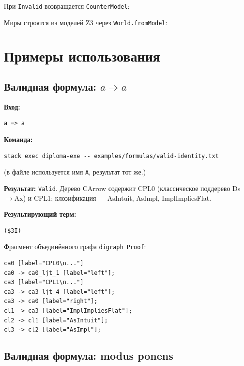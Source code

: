 \documentclass[a4paper,12pt]{article}
\newenvironment{listingcenter}{%
  \begin{center}\begin{minipage}{\linewidth}%
}{%
  \end{minipage}\end{center}%
}
\newcommand{\hssnippet}[2]{%
  \begin{listingcenter}%
  \end{listingcenter}}
\begin{document}
При \texttt{Invalid} возвращается \texttt{CounterModel}:
\hssnippet{countermodel.hs}{Структура контрмодели \texttt{CounterModel}}

Миры строятся из моделей Z3 через \texttt{World.fromModel}:
\hssnippet{world-fromModel.hs}{Построение мира из модели Z3: \texttt{World.fromModel}}

\section{Примеры использования}

\subsection{Валидная формула: $a \Rightarrow a$}

\textbf{Вход:}
\begin{lstlisting}[style=formula,caption={Входная формула: \texttt{a => a}},label={lst:ex-valid-a}]
a => a
\end{lstlisting}

\textbf{Команда:}
\begin{lstlisting}[caption={Запуск на примере \texttt{valid-identity.txt}},label={lst:ex-run}]
stack exec diploma-exe -- examples/formulas/valid-identity.txt
\end{lstlisting}

(в файле используется имя \verb|A|, результат тот же.)

\textbf{Результат:} \texttt{Valid}. Дерево CArrow содержит CPL0 (классическое
поддерево Ds$\to$Ax) и CPL1; клозификация --- AsIntuit, AsImpl, ImplImpliesFlat.

\textbf{Результирующий терм:}
\begin{lstlisting}[caption={Редуцированный $\lambda$-терм для \texttt{A => A}},label={lst:ex-valid-a-term}]
($3I)
\end{lstlisting}

Фрагмент объединённого графа \texttt{digraph Proof}:
\begin{lstlisting}[caption={Фрагмент графа \texttt{digraph Proof} для \texttt{a => a}},label={lst:ex-proof-dot}]
ca0 [label="CPL0\n..."]
ca0 -> ca0_ljt_1 [label="left"];
ca3 [label="CPL1\n..."]
ca3 -> ca3_ljt_4 [label="left"];
ca3 -> ca0 [label="right"];
cl1 -> ca3 [label="ImplImpliesFlat"];
cl2 -> cl1 [label="AsIntuit"];
cl3 -> cl2 [label="AsImpl"];
\end{lstlisting}

\subsection{Валидная формула: modus ponens}
\end{document}
